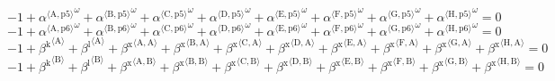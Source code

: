 \begin{equation}
-1 + {{\alpha}^{\langle \mathrm{\mathrm{A}},\mathrm{\mathrm{p5}}\rangle}}^{\omega} + {{\alpha}^{\langle \mathrm{\mathrm{B}},\mathrm{\mathrm{p5}}\rangle}}^{\omega} + {{\alpha}^{\langle \mathrm{\mathrm{C}},\mathrm{\mathrm{p5}}\rangle}}^{\omega} + {{\alpha}^{\langle \mathrm{\mathrm{D}},\mathrm{\mathrm{p5}}\rangle}}^{\omega} + {{\alpha}^{\langle \mathrm{\mathrm{E}},\mathrm{\mathrm{p5}}\rangle}}^{\omega} + {{\alpha}^{\langle \mathrm{\mathrm{F}},\mathrm{\mathrm{p5}}\rangle}}^{\omega} + {{\alpha}^{\langle \mathrm{\mathrm{G}},\mathrm{\mathrm{p5}}\rangle}}^{\omega} + {{\alpha}^{\langle \mathrm{\mathrm{H}},\mathrm{\mathrm{p5}}\rangle}}^{\omega} = 0
\end{equation}
\begin{equation}
-1 + {{\alpha}^{\langle \mathrm{\mathrm{A}},\mathrm{\mathrm{p6}}\rangle}}^{\omega} + {{\alpha}^{\langle \mathrm{\mathrm{B}},\mathrm{\mathrm{p6}}\rangle}}^{\omega} + {{\alpha}^{\langle \mathrm{\mathrm{C}},\mathrm{\mathrm{p6}}\rangle}}^{\omega} + {{\alpha}^{\langle \mathrm{\mathrm{D}},\mathrm{\mathrm{p6}}\rangle}}^{\omega} + {{\alpha}^{\langle \mathrm{\mathrm{E}},\mathrm{\mathrm{p6}}\rangle}}^{\omega} + {{\alpha}^{\langle \mathrm{\mathrm{F}},\mathrm{\mathrm{p6}}\rangle}}^{\omega} + {{\alpha}^{\langle \mathrm{\mathrm{G}},\mathrm{\mathrm{p6}}\rangle}}^{\omega} + {{\alpha}^{\langle \mathrm{\mathrm{H}},\mathrm{\mathrm{p6}}\rangle}}^{\omega} = 0
\end{equation}
\begin{equation}
-1 + {\beta^{\mathrm{k}}}^{\langle \mathrm{\mathrm{A}}\rangle} + {\beta^{\mathrm{l}}}^{\langle \mathrm{\mathrm{A}}\rangle} + {\beta^{\mathrm{x}}}^{\langle \mathrm{\mathrm{A}},\mathrm{\mathrm{A}}\rangle} + {\beta^{\mathrm{x}}}^{\langle \mathrm{\mathrm{B}},\mathrm{\mathrm{A}}\rangle} + {\beta^{\mathrm{x}}}^{\langle \mathrm{\mathrm{C}},\mathrm{\mathrm{A}}\rangle} + {\beta^{\mathrm{x}}}^{\langle \mathrm{\mathrm{D}},\mathrm{\mathrm{A}}\rangle} + {\beta^{\mathrm{x}}}^{\langle \mathrm{\mathrm{E}},\mathrm{\mathrm{A}}\rangle} + {\beta^{\mathrm{x}}}^{\langle \mathrm{\mathrm{F}},\mathrm{\mathrm{A}}\rangle} + {\beta^{\mathrm{x}}}^{\langle \mathrm{\mathrm{G}},\mathrm{\mathrm{A}}\rangle} + {\beta^{\mathrm{x}}}^{\langle \mathrm{\mathrm{H}},\mathrm{\mathrm{A}}\rangle} = 0
\end{equation}
\begin{equation}
-1 + {\beta^{\mathrm{k}}}^{\langle \mathrm{\mathrm{B}}\rangle} + {\beta^{\mathrm{l}}}^{\langle \mathrm{\mathrm{B}}\rangle} + {\beta^{\mathrm{x}}}^{\langle \mathrm{\mathrm{A}},\mathrm{\mathrm{B}}\rangle} + {\beta^{\mathrm{x}}}^{\langle \mathrm{\mathrm{B}},\mathrm{\mathrm{B}}\rangle} + {\beta^{\mathrm{x}}}^{\langle \mathrm{\mathrm{C}},\mathrm{\mathrm{B}}\rangle} + {\beta^{\mathrm{x}}}^{\langle \mathrm{\mathrm{D}},\mathrm{\mathrm{B}}\rangle} + {\beta^{\mathrm{x}}}^{\langle \mathrm{\mathrm{E}},\mathrm{\mathrm{B}}\rangle} + {\beta^{\mathrm{x}}}^{\langle \mathrm{\mathrm{F}},\mathrm{\mathrm{B}}\rangle} + {\beta^{\mathrm{x}}}^{\langle \mathrm{\mathrm{G}},\mathrm{\mathrm{B}}\rangle} + {\beta^{\mathrm{x}}}^{\langle \mathrm{\mathrm{H}},\mathrm{\mathrm{B}}\rangle} = 0
\end{equation}
